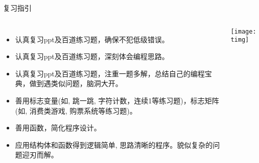 \begin{frame}{复习指引}
\vspace{-0.2cm}
\begin{columns}
	\begin{itemize}
		\item 认真复习ppt及百道练习题，确保不犯低级错误。
		\item 认真复习ppt及百道练习题，深刻体会编程思路。
		\item 认真复习ppt及百道练习题，注重一题多解，总结自己的编程宝典，做到遇类似问题，脑洞大开。
		\item 善用标志变量(如, 跳一跳, 字符计数，连续1等练习题)，标志矩阵(如, 消费类游戏, 购票系统等练习题)。
		\item 善用函数，简化程序设计。
		\item 应用结构体和函数得到逻辑简单, 思路清晰的程序。貌似复杂的问题迎刃而解。 
	\end{itemize}
	\centering\texttt{[image: timg]}
\end{columns}
\end{frame}

